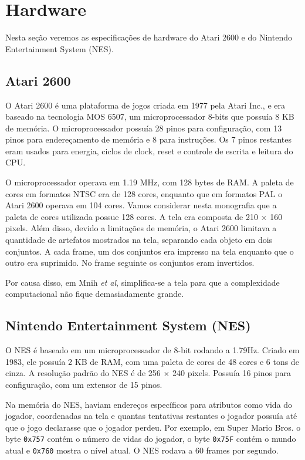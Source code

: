 \documentclass[a4paper,10pt]{article}
\theoremstyle{plain}
\begin{document}
\section{Hardware}

Nesta seção veremos as especificações de hardware do Atari 2600 e do Nintendo Entertainment System
(NES).

\subsection{Atari 2600}

O Atari 2600 é uma plataforma de jogos criada em 1977 pela Atari Inc., e era baseado na tecnologia
MOS 6507, um microprocessador 8-bits que possuía 8 KB de memória. O microprocessador possuía 28
pinos para configuração, com 13 pinos para endereçamento de memória e 8 para instruções. Os 7 pinos
restantes eram usados para energia, ciclos de clock, reset e controle de escrita e leitura do CPU.

O microprocessador operava em 1.19 MHz, com 128 bytes de RAM. A paleta de cores em formatos NTSC
era de 128 cores, enquanto que em formatos PAL o Atari 2600 operava em 104 cores. Vamos considerar
nesta monografia que a paleta de cores utilizada possue 128 cores. A tela era composta de 210
$\times$ 160 pixels. Além disso, devido a limitações de memória, o Atari 2600 limitava a quantidade
de artefatos mostrados na tela, separando cada objeto em dois conjuntos. A cada frame,
um dos conjuntos era impresso na tela enquanto que o outro era suprimido. No frame seguinte os
conjuntos eram invertidos.

Por causa disso, em Mnih \textit{et al}\cite{mnih-et-al}, simplifica-se a tela para que a
complexidade computacional não fique demasiadamente grande.

\subsection{Nintendo Entertainment System (NES)}

O NES é baseado em um microprocessador de 8-bit rodando a 1.79Hz. Criado em 1983, ele possuía 2 KB
de RAM, com uma paleta de cores de 48 cores e 6 tons de cinza. A resolução padrão do NES é de 256
$\times$ 240 pixels. Possuía 16 pinos para configuração, com um extensor de 15 pinos.

Na memória do NES, haviam endereços específicos para atributos como vida do jogador, coordenadas na
tela e quantas tentativas restantes o jogador possuía até que o jogo declarasse que o jogador
perdeu. Por exemplo, em Super Mario Bros. o byte \texttt{0x757} contém o número de vidas do
jogador, o byte \texttt{0x75F} contém o mundo atual e \texttt{0x760} mostra o nível atual. O NES
rodava a 60 frames por segundo.
\end{document}
